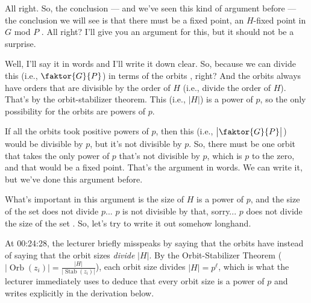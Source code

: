 \begin{proofWrapper}
\begin{speech}[00:23:48 - 00:25:39]
All right. So, the conclusion --- and we've seen this kind of argument before --- the conclusion we will see is that there must be a fixed point, an $H$-fixed point in $G$ mod $P$ . All right? I'll give you an argument for this, but it should not be a surprise.

Well, I'll say it in words and I'll write it down clear. So, because we can divide this (i.e., $\faktor{G}{P}$) in terms of the orbits , right? And the orbits always have orders that are divisible by the order of $H$ (i.e., divide the order of $H$). That's by the orbit-stabilizer theorem. This (i.e., $|H|$) is a power of $p$, so the only possibility for the orbits are powers of $p$.

If all the orbits took positive powers of $p$, then this (i.e., $\bigl|\faktor{G}{P}\bigr|$) would be divisible by $p$, but it's not divisible by $p$. So, there must be one orbit that takes the only power of $p$ that's not divisible by $p$, which is $p$ to the zero, and that would be a fixed point. That's the argument in words. We can write it, but we've done this argument before.

What's important in this argument is the size of $H$ is a power of $p$, and the size of the set does not divide $p$... $p$ is not divisible by that, sorry... $p$ does not divide the size of the set . So, let's try to write it out somehow longhand.
\end{speech}

\begin{content}
\end{content}

\begin{aiNote}
At 00:24:28, the lecturer briefly misspeaks by saying that the orbits have  instead of saying that the orbit sizes \emph{divide} $|H|$. By the Orbit-Stabilizer Theorem ($|\operatorname{Orb}(z_i)| = \frac{|H|}{|\operatorname{Stab}(z_i)|}$), each orbit size divides $|H| = p^\ell$, which is what the lecturer immediately uses to deduce that every orbit size is a power of $p$ and writes explicitly in the derivation below.
\end{aiNote}


\end{proofWrapper}
